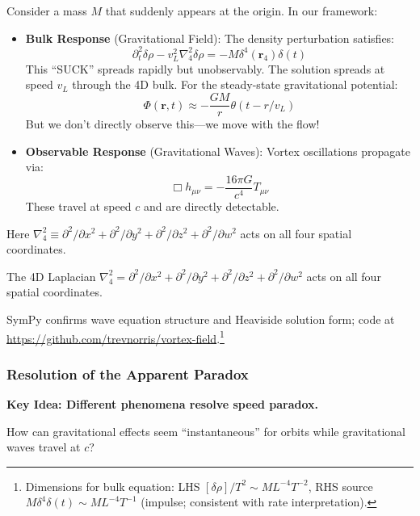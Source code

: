 Consider a mass $M$ that suddenly appears at the origin. In our framework:

\begin{itemize}
\item \textbf{Bulk Response} (Gravitational Field): The density perturbation satisfies:
\begin{equation}
\partial_t^2 \delta\rho - v_L^2 \nabla_4^2 \delta\rho = -M\delta^4(\mathbf{r}_4)\delta(t)
\end{equation}
This ``SUCK'' spreads rapidly but unobservably. The solution spreads at speed $v_L$ through the 4D bulk. For the steady-state gravitational potential:
\begin{equation}
\Phi(\mathbf{r},t) \approx -\frac{GM}{r} \theta(t - r/v_L)
\end{equation}
But we don't directly observe this---we move with the flow!

\item \textbf{Observable Response} (Gravitational Waves): Vortex oscillations propagate via:
\begin{equation}
\Box h_{\mu\nu} = -\frac{16\pi G}{c^4} T_{\mu\nu}
\end{equation}
These travel at speed $c$ and are directly detectable.
\end{itemize}

Here $\nabla_4^2 \equiv \partial^2/\partial x^2 + \partial^2/\partial y^2 + \partial^2/\partial z^2 + \partial^2/\partial w^2$ acts on all four spatial coordinates.

The 4D Laplacian $\nabla_4^2 = \partial^2/\partial x^2 + \partial^2/\partial y^2 + \partial^2/\partial z^2 + \partial^2/\partial w^2$ acts on all four spatial coordinates.

SymPy confirms wave equation structure and Heaviside solution form; code at \url{https://github.com/trevnorris/vortex-field}.\footnote{Dimensions for bulk equation: LHS $[\delta\rho] / T^2 \sim M L^{-4} T^{-2}$, RHS source $M \delta^4 \delta(t) \sim M L^{-4} T^{-1}$ (impulse; consistent with rate interpretation).}

\subsubsection{Resolution of the Apparent Paradox}

\textbf{Key Idea: Different phenomena resolve speed paradox.}

How can gravitational effects seem ``instantaneous'' for orbits while gravitational waves travel at $c$?

